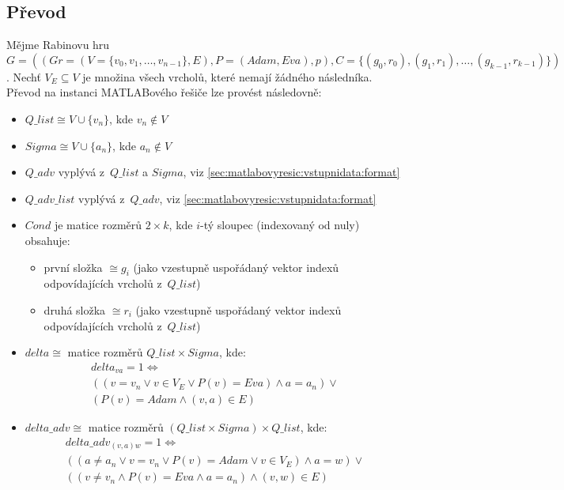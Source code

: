 \subsection{Převod}
\label{subsec:matlab:vstup:prevod}
Mějme Rabinovu hru $G = ((Gr = (V = \{v_0, v_1, \dotsc, v_{n-1}\}, E), P = (Adam, Eva), p), C = \{(g_0, r_0), (g_1, r_1), \dotsc, (g_{k-1}, r_{k-1})\})$. Nechť $V_E \subseteq V$ je množina všech vrcholů, které nemají žádného následníka. Převod na instanci MATLABového řešiče lze provést následovně:
\begin{itemize}
\item $Q\_list \cong V \cup\{v_n\}$, kde $v_n \notin V$
\item $Sigma \cong V \cup \{a_n\}$, kde $a_n \notin V$
\item $Q\_adv$ vyplývá z~$Q\_list$ a $Sigma$, viz \ref{sec:matlabovyresic:vstupnidata:format}
\item $Q\_adv\_list$ vyplývá z~$Q\_adv$, viz \ref{sec:matlabovyresic:vstupnidata:format}
\item $Cond$ je matice rozměrů $2 \times k$, kde $i$-tý sloupec (indexovaný od nuly) obsahuje:
\begin{itemize}
\item první složka $\cong g_i$ (jako vzestupně uspořádaný vektor indexů odpovídajících vrcholů z~$Q\_list$)
\item druhá složka $\cong r_i$ (jako vzestupně uspořádaný vektor indexů odpovídajících vrcholů z~$Q\_list$)
\end{itemize}
\item $delta \cong$ matice rozměrů $Q\_list \times Sigma$, kde:
\begin{eqnarray*}
&delta_{va} = 1 \Leftrightarrow& \\
&((v = v_n \vee v \in V_E \vee P(v) = Eva) \wedge a = a_n) \vee& \\
&(P(v) = Adam \wedge (v, a) \in E)&
\end{eqnarray*}
\item $delta\_adv \cong$ matice rozměrů $(Q\_list \times Sigma) \times Q\_list$, kde:
\begin{eqnarray*}
&delta\_adv_{(v,a)w} = 1 \Leftrightarrow& \\
&((a \neq a_n \vee v = v_n \vee P(v) = Adam \vee v \in V_E) \wedge a = w) \vee& \\
&((v \neq v_n \wedge P(v) = Eva \wedge a = a_n) \wedge (v, w) \in E)&
\end{eqnarray*}
\end{itemize}

